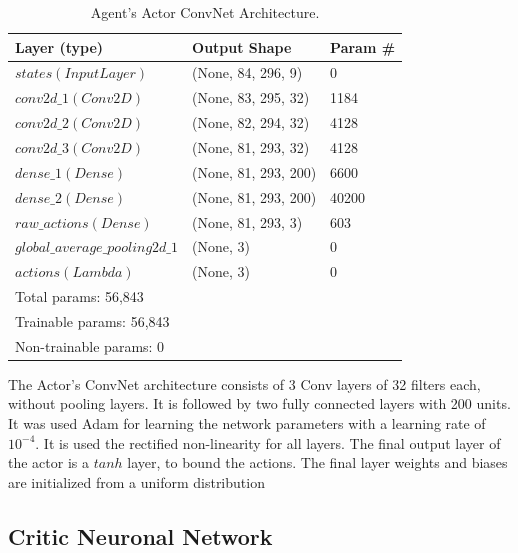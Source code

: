 \documentclass[peerreview,onecolumn]{IEEEtran}
\begin{document}
	 \begin{table}[h] 
	\centering
	\begin{tabular}{l l l} 
		\toprule 
		Layer (type) & Output Shape & Param \# \\ 		
		\midrule
		$states (InputLayer)$ & (None, 84, 296, 9) & 0\\ 
		$conv2d\_1 (Conv2D)$ & (None, 83, 295, 32) & 1184  \\ 
		$conv2d\_2 (Conv2D)$ & (None, 82, 294, 32) & 4128  \\
		$conv2d\_3 (Conv2D)$ & (None, 81, 293, 32) & 4128  \\
		$dense\_1 (Dense)$  & (None, 81, 293, 200) & 6600  \\   
		$dense\_2 (Dense)$ & (None, 81, 293, 200)  & 40200 \\
		$raw\_actions (Dense)$ & (None, 81, 293, 3) & 603  \\
		$global\_average\_pooling2d\_1$ & (None, 3) & 0  \\
		$actions (Lambda)$ & (None, 3) &  0 \\
		\midrule 
		\midrule
		Total params: 56,843 & &  \\
		Trainable params: 56,843 & &  \\
		Non-trainable params: 0 & & \\

		\bottomrule 
	\end{tabular}
	\smallskip 
	\caption{Agent's Actor ConvNet Architecture.} 
	\label{tab:actor_arch} 
\end{table}

The Actor's ConvNet architecture consists of 3 Conv layers of 32 filters each, without pooling layers. It is followed by two fully connected layers with 200 units. It was used Adam \cite{adam_2014} for learning the network parameters with a learning rate of $10^{-4}$. It is used the rectified non-linearity \cite{relu_2011} for all layers. The final output layer of the actor is a $tanh$ layer, to bound the actions. The final layer weights and biases are initialized from a uniform distribution
	 
	 \subsection{Critic Neuronal Network}
	 
\end{document}
